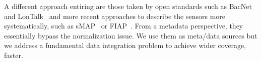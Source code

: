 A different approach entiring are those taken by open standards such as BacNet and 
LonTalk~\cite{bacnet, lontalk} and more recent approaches to describe the sensors more
systematically, such as sMAP~\cite{smap} or FIAP~\cite{fiap}.  From a metadata perspective, they
essentially bypass the normalization issue.  We use them as meta/data sources but we address a
fundamental data integration problem to achieve wider coverage, faster.
